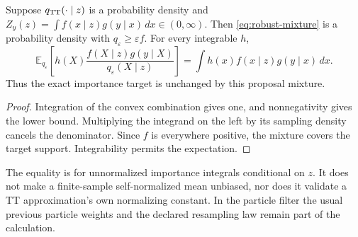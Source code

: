 \begin{proposition}
\label{prop:robust-mixture-correction}
Suppose $q_{\rm TT}(\cdot\mid z)$ is a probability density and
$Z_y(z)=\int f(x\mid z)g(y\mid x)\,dx\in(0,\infty)$.
Then \eqref{eq:robust-mixture} is a probability density with
$q_\varepsilon\ge\varepsilon f$. For every integrable $h$,
\begin{equation}
 \mathbb E_{q_\varepsilon}\!\left[
 h(X)\frac{f(X\mid z)g(y\mid X)}{q_\varepsilon(X\mid z)}\right]
 =\int h(x)f(x\mid z)g(y\mid x)\,dx .
 \label{eq:robust-importance}
\end{equation}
Thus the exact importance target is unchanged by this proposal mixture.
\end{proposition}
\begin{proof}
Integration of the convex combination gives one, and nonnegativity gives
the lower bound. Multiplying the integrand on the left by its sampling
density cancels the denominator. Since $f$ is everywhere positive, the
mixture covers the target support. Integrability permits the expectation.
\end{proof}

The equality is for unnormalized importance integrals conditional on $z$.
It does not make a finite-sample self-normalized mean unbiased, nor does it
validate a TT approximation's own normalizing constant. In the particle
filter the usual previous particle weights and the declared resampling law
remain part of the calculation.

